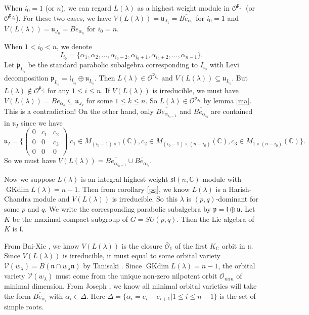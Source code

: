 \documentclass{amsart}[12pt]
\def\fuu{\mathfrak{u}}
\renewcommand{\subset}{\subseteq}
\newcommand{\gkd}{\operatorname{GKdim}}
\numberwithin{equation}{section}
\begin{document}
 When $i_0=1$ (or $n$), we can regard $L(\lambda)$ as a highest weight module in $\mathscr{O}^{\mathfrak{p}_{J_1}}$ (or $\mathscr{O}^{\mathfrak{p}_{J_n}}$). For these two cases,  we have $V( L(\lambda))=\fuu_{J_1}=\overline{Be_{\alpha_{1}}}$ for $i_0=1$ and  $V( L(\lambda))=\fuu_{J_n}=\overline{Be_{\alpha_{n}}}$ for $i_0=n$.
 
When $1<i_0<n$, we denote $$I_{i_0}=\{\alpha_{1},\alpha_{2},...,\alpha_{i_0-2},\alpha_{i_0+1},\alpha_{i_0+2},...,\alpha_{n-1}\}.$$ Let $\mathfrak{p}_{I_{i_0}}$ be the standard parabolic subalgebra corresponding to $I_{i_0}$ with Levi decomposition $\mathfrak{p}_{I_{i_0}}=\mathfrak{l}_{I_{i_0}}\oplus \mathfrak{u}_{I_{i_0}}$.
Then $L(\lambda)\in \mathscr{O}^{\mathfrak{p}_{I_{i_0}}}$ and $V(L(\lambda))\subset \fuu_{I_{i_0}}$.  But  $L(\lambda)\notin \mathscr{O}^{\mathfrak{p}_{J_i}}$ for any 
$1\leq i\leq n$.
If $V(L(\lambda))$ is irreducible, we must have $V(L(\lambda))=\overline{Be_{\alpha_{k}}}\subset \mathfrak{u}_{J_k}$ for some $1\leq k\leq n$. So $L(\lambda)\in \mathscr{O}^{\mathfrak{p}_{J_k}}$  by lemma \ref{ma}. This is a contradiction! On the other hand, only
$\overline{Be_{\alpha_{i_0-1}}}$ and $\overline{Be_{\alpha_{i_0}}}$ are contained in $\mathfrak{u}_I$ since we have $$\mathfrak{u}_I=\{\left(
\begin{array}{ccc}
0 & c_1& c_2 \\
0 & 0&c_3 \\
0&0&0
\end{array}
\right)|c_1\in M_{(i_0-1)\times 1}(\mathbb{C}), c_2\in M_{(i_0-1)\times (n-i_0)}(\mathbb{C}), c_3\in M_{1\times (n-i_0)}(\mathbb{C})\}.$$
So we must have $V(L(\lambda))=\overline{Be_{\alpha_{i_0-1}}}\cup \overline{Be_{\alpha_{i_0}}}$.  

Now we suppose $L(\lambda)$ is an integral highest weight $\mathfrak{sl}(n,\mathbb{C})$-module with $\gkd L(\lambda)=n-1$. Then from corollary \ref{pq}, we know $L(\lambda)$ is a Harish-Chandra module and  $V(L(\lambda))$ is irreducible. So this $\lambda$ is $(p,q)$-dominant for some $p$ and $q$. We write the corresponding parabolic subalgebra by $\mathfrak{p}=\mathfrak{l} \oplus \mathfrak{u}$. Let $K$ be the maximal compact subgroup of $G=SU(p,q)$. Then the Lie algebra of $K$ is $\mathfrak{l}$.

From Bai-Xie \cite{BX}, we know  $V( L(\lambda))$  is the  closure $\bar{\mathcal{O}}_1$ of the first $K_{\mathbb{C}}$ orbit in $\mathfrak{u}$.
Since  $V( L(\lambda))$ is irreducible, it must equal to some orbital variety $\mathcal{V}(w_{\lambda})=\overline{B(\mathfrak{n}\cap w_{\lambda}\mathfrak{n})}$ by Tanisaki \cite{Ta}.
Since  $\gkd L(\lambda)=n-1$, the orbital variety $\mathcal{V}(w_{\lambda})$ must come from the unique non-zero nilpotent orbit $\mathcal{O}_{min}$ of minimal dimension.
From Joseph \cite{Jo98}, we know all   minimal orbital varieties will take the form $\overline{Be_{\alpha_{i}}}$ with $\alpha_i \in \Delta$. Here $\Delta=\{\alpha_i=e_i-e_{i+1}|1\leq i \leq n-1\}$ is the set of simple roots.
\end{document}
